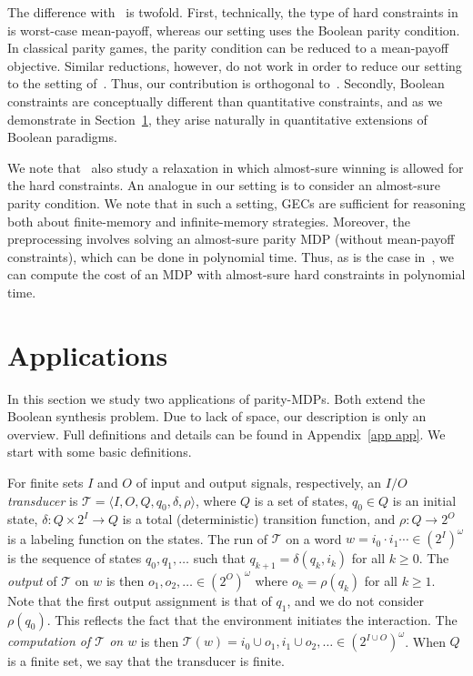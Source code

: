 \documentclass[runningheads,a4paper]{llncs}
\newcommand{\zug}[1]{\langle #1  \rangle}
\newcommand{\T}{{\mathcal T}}
\newcommand{\tIN}{{2^I}}
\newcommand{\tOUT}{{2^O}}
\newcommand{\tINo}{{{(2^I)}^\omega}}
\newcommand{\tOUTo}{{{(2^O)}^\omega}}
\newcommand{\gecs}{{GECs}\xspace}
\begin{document}
The difference with~\cite{CR15} is twofold. First, technically, the type of hard constraints in~\cite{CR15} is worst-case mean-payoff, whereas our setting uses the Boolean parity condition. In classical parity games, the parity condition can be reduced to a mean-payoff objective. Similar reductions, however, do not work in order to reduce our setting to the setting of~\cite{CR15}. Thus, our contribution is orthogonal to~\cite{CR15}. Secondly, Boolean constraints are conceptually different than quantitative constraints, and as we demonstrate in Section~\ref{sec:applications}, they arise naturally in quantitative extensions of Boolean paradigms.

We note that~\cite{CR15} also study a relaxation in which  almost-sure winning is allowed for the hard constraints. An analogue in our setting is to consider an almost-sure parity condition. We note that in such a setting, \gecs are sufficient for reasoning both about finite-memory and infinite-memory strategies. 
Moreover, the preprocessing involves solving an almost-sure parity MDP (without mean-payoff constraints), which can be done in polynomial time.
Thus, as is the case in~\cite{CR15}, we can compute the cost of an MDP with almost-sure hard constraints in polynomial time.




\section{Applications}
\label{sec:applications}

In this section we study two applications of parity-MDPs. Both extend the Boolean synthesis problem. 
Due to lack of space, our description is only an overview. Full definitions and details can be found in Appendix~\ref{app app}.
We start with some basic definitions.

For finite sets $I$ and $O$ of input and output signals, respectively, an {\em $I/O$  transducer} is $\T=\zug{I,O,Q,q_0,\delta,\rho}$, where $Q$ is a set of states, $q_0 \in Q$ is an initial state, $\delta: Q\times \tIN \to Q$ is a total (deterministic) transition function, and $\rho:Q\to \tOUT$ is a labeling function on the states. The run of $\T$ on a word $w=i_0 \cdot i_1 \cdots \in \tINo$ is the sequence of states $q_0,q_1,\ldots$ such that $q_{k+1} = \delta(q_k,i_{k})$ for all $k \geq 0$. The {\em output} of $\T$ on $w$ is then $o_1,o_2,\ldots\in \tOUTo$ where $o_k=\rho(q_{k})$ for all $k\ge 1$. Note that the first output assignment is that of $q_1$, and we do not consider $\rho(q_0)$. This reflects the fact that the environment initiates the interaction. The {\em computation of $\T$ on $w$\/} is then 
$\T(w)=i_0\cup o_1,i_1\cup o_2,\ldots \in (2^{I \cup O})^\omega$.
When $Q$ is a finite set, we say that the transducer is  finite.
\end{document}
